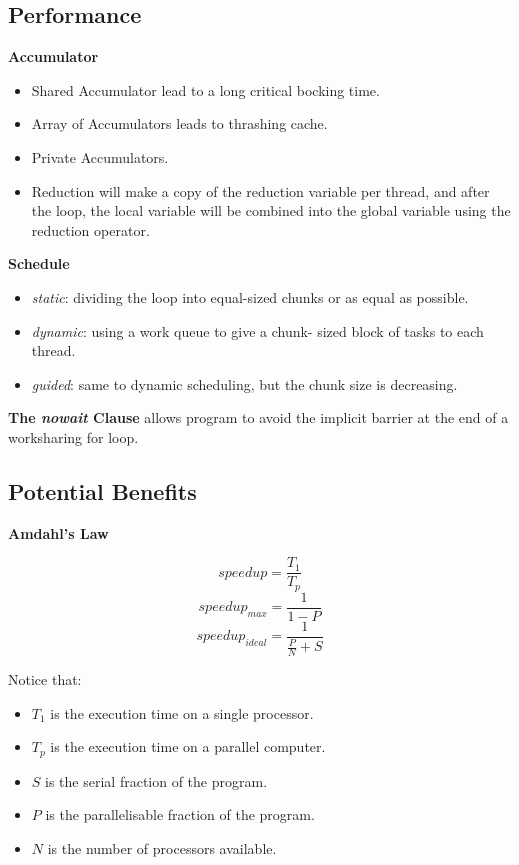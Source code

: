 \documentclass{article}
\begin{document}
\subsection{Performance}

\textbf{Accumulator}

\begin{itemize}
    \item Shared Accumulator lead to a long critical bocking time.
    \item Array of Accumulators leads to thrashing cache.
    \item Private Accumulators.
    \item Reduction will make a copy of the reduction variable per thread, and after the loop, the local variable will be combined into the global variable using the reduction operator.
\end{itemize}

\textbf{Schedule}

\begin{itemize}
    \item \textit{static}: dividing the loop into equal-sized chunks or as equal as possible.
    \item \textit{dynamic}: using a work queue to give a chunk- sized block of tasks to each thread.
    \item \textit{guided}: same to dynamic scheduling, but the chunk size is decreasing.
\end{itemize}

\textbf{The \textit{nowait} Clause} allows program to avoid the implicit barrier at the end of a worksharing for loop.

\subsection{Potential Benefits}

\textbf{Amdahl's Law}

\begin{equation}
    speedup = \frac{T_1}{T_p}
\end{equation}
\begin{equation}
    speedup_{max} = \frac{1}{1-P}
\end{equation}
\begin{equation}
    speedup_{ideal} = \frac{1}{\frac{P}{N} + S}
\end{equation}

Notice that:
\begin{itemize}
    \item $T_1$ is the execution time on a single processor.
    \item $T_p$ is the execution time on a parallel computer.
    \item $S$ is the serial fraction of the program.
    \item $P$ is the parallelisable fraction of the program.
    \item $N$ is the number of processors available.
\end{itemize}
\end{document}
